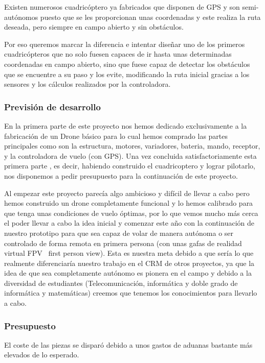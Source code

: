 \documentclass[12pt,twoside]{report}
\begin{document}
Existen numerosos cuadricóptero ya fabricados que disponen de GPS y son semi-autónomos puesto que se les proporcionan unas coordenadas y este realiza la ruta deseada, pero siempre en campo abierto y sin obstáculos.

Por eso queremos marcar la diferencia e intentar diseñar uno de los primeros cuadricópteros que no solo fuesen capaces de ir hasta unas determinadas coordenadas en campo abierto, sino que fuese capaz de detectar los obstáculos que se encuentre a su paso y los evite, modificando la ruta inicial gracias a los sensores y los cálculos realizados por la controladora.


\subsubsection{Previsión de desarrollo}
En la primera parte de este proyecto nos hemos dedicado exclusivamente a la fabricación de un Drone básico para lo cual hemos comprado las partes principales como son la estructura, motores, variadores, bateria, mando, receptor, y la controladora de vuelo (con GPS). Una vez concluida satisfactoriamente esta primera parte , es decir, habiendo construido el cuadricoptero y lograr pilotarlo, nos disponemos a pedir presupuesto para la continuación de este proyecto.

Al empezar este proyecto parecía algo ambicioso y difícil de llevar a cabo pero hemos construido un drone completamente funcional y lo hemos calibrado para que tenga unas condiciones de vuelo óptimas, por lo que vemos mucho más cerca el poder llevar a cabo la idea inicial y comenzar este año con la continuación de nuestro prototipo para que sea capaz de volar de manera autónoma o ser controlado de forma remota en primera persona (con unas gafas de realidad virtual FPV  first person view). Esta es nuestra meta debido a que sería lo que realmente diferenciaría nuestro trabajo en el CRM de otros proyectos, ya que la idea de que sea completamente autónomo es pionera en el campo y debido a la diversidad de estudiantes (Telecomunicación, informática y doble grado de informática y matemáticas) creemos que tenemos los conocimientos para llevarlo a cabo.

\subsubsection{Presupuesto}
El coste de las piezas se disparó debido a unos gastos de aduanas bastante más elevados de lo esperado.
\end{document}
